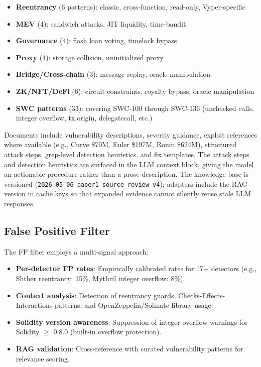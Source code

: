\documentclass[conference]{IEEEtran}
\begin{document}
\begin{itemize}
    \item \textbf{Reentrancy} (6 patterns): classic, cross-function, read-only, Vyper-specific
    \item \textbf{MEV} (4): sandwich attacks, JIT liquidity, time-bandit
    \item \textbf{Governance} (4): flash loan voting, timelock bypass
    \item \textbf{Proxy} (4): storage collision, uninitialized proxy
    \item \textbf{Bridge/Cross-chain} (3): message replay, oracle manipulation
    \item \textbf{ZK/NFT/DeFi} (6): circuit constraints, royalty bypass, oracle manipulation
    \item \textbf{SWC patterns} (33): covering SWC-100 through SWC-136 (unchecked calls, integer overflow, tx.origin, delegatecall, etc.)
\end{itemize}

Documents include vulnerability descriptions, severity guidance, exploit references where available (e.g., Curve \$70M, Euler \$197M, Ronin \$624M), structured attack steps, grep-level detection heuristics, and fix templates. The attack steps and detection heuristics are surfaced in the LLM context block, giving the model an actionable procedure rather than a prose description. The knowledge base is versioned (\texttt{2026-05-06-paper1-source-review-v4}); adapters include the RAG version in cache keys so that expanded evidence cannot silently reuse stale LLM responses.

\subsection{False Positive Filter}

The FP filter employs a multi-signal approach:
\begin{itemize}
    \item \textbf{Per-detector FP rates}: Empirically calibrated rates for 17+ detectors (e.g., Slither reentrancy: 15\%, Mythril integer overflow: 8\%).
    \item \textbf{Context analysis}: Detection of reentrancy guards, Checks-Effects-Interactions patterns, and OpenZeppelin/Solmate library usage.
    \item \textbf{Solidity version awareness}: Suppression of integer overflow warnings for Solidity $\geq$ 0.8.0 (built-in overflow protection).
    \item \textbf{RAG validation}: Cross-reference with curated vulnerability patterns for relevance scoring.
\end{itemize}
\end{document}
